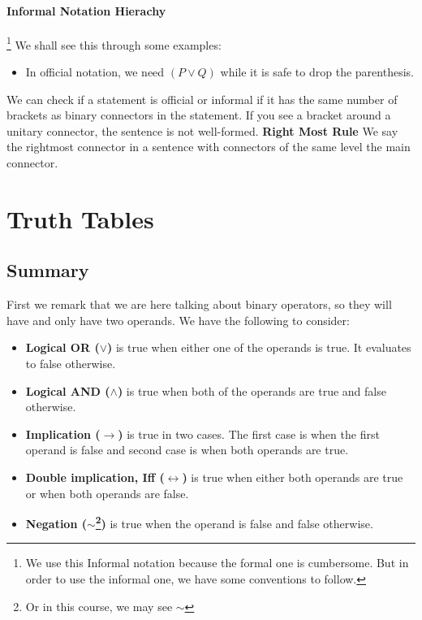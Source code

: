 \documentclass[10pt]{article}
\renewcommand{\iff}{\leftrightarrow}
\renewcommand{\implies}{\rightarrow}
\renewcommand{\neg}{\sim}
\begin{document}
\paragraph{Informal Notation Hierachy}\footnote{We use this Informal notation because the formal one is cumbersome. But in order to use the informal one, we have some conventions to follow.} 
We shall see this through some examples:
\begin{itemize}
    \item In official notation, we need $(P\vee Q)$ while it is safe to drop the parenthesis.
\end{itemize}
We can check if a statement is official or informal if it has the same number of brackets as binary connectors in the statement. If you see a bracket around a unitary connector, the sentence is not well-formed.
\textbf{Right Most Rule} We say the rightmost connector in a sentence with connectors of the same level the main connector.



\section{Truth Tables}
\subsection{Summary} First we remark that we are here talking about binary operators, 
so they will have and only have two operands. We have the following to consider:
\begin{itemize}
    \item \textbf{Logical OR ($\vee$)} is true when either one of the operands is true. 
        It evaluates to false otherwise.
    \item \textbf{Logical AND ($\land$)} is true when both of the operands are true and false otherwise.
    \item \textbf{Implication ($\implies$)} is true in two cases. The first case is when the
        first operand is false and second case is when both operands are true.
    \item \textbf{Double implication, Iff ($\iff$)} is true when either both operands are true 
        or when both operands are false.
    \item \textbf{Negation ($\neg$\footnote{Or in this course, we may see $\sim$})} is true when the operand
        is false and false otherwise.
\end{itemize}
\end{document}
